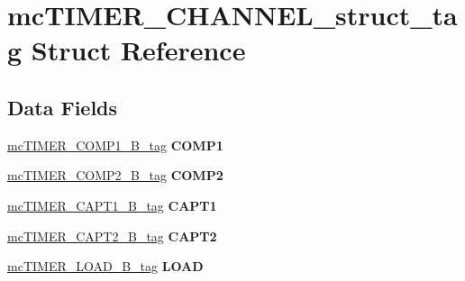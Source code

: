 \hypertarget{structmcTIMER__CHANNEL__struct__tag}{}\section{mc\+T\+I\+M\+E\+R\+\_\+\+C\+H\+A\+N\+N\+E\+L\+\_\+struct\+\_\+tag Struct Reference}
\label{structmcTIMER__CHANNEL__struct__tag}
\subsection*{Data Fields}
\begin{DoxyCompactItemize}
\item 
\mbox{\label{structmcTIMER__CHANNEL__struct__tag_a0a1e902e42060cc5f6656017c31a47cc}} 
\mbox{\hyperlink{unionmcTIMER__COMP1__16B__tag}{mc\+T\+I\+M\+E\+R\+\_\+\+C\+O\+M\+P1\+\_\+B\+\_\+tag}} {\bfseries C\+O\+M\+P1}
\item 
\mbox{\label{structmcTIMER__CHANNEL__struct__tag_a71be2052f0bfc9af76dfc9df661fd1a9}} 
\mbox{\hyperlink{unionmcTIMER__COMP2__16B__tag}{mc\+T\+I\+M\+E\+R\+\_\+\+C\+O\+M\+P2\+\_\+B\+\_\+tag}} {\bfseries C\+O\+M\+P2}
\item 
\mbox{\label{structmcTIMER__CHANNEL__struct__tag_aef961e7741068f7a682167849ea41e52}} 
\mbox{\hyperlink{unionmcTIMER__CAPT1__16B__tag}{mc\+T\+I\+M\+E\+R\+\_\+\+C\+A\+P\+T1\+\_\+B\+\_\+tag}} {\bfseries C\+A\+P\+T1}
\item 
\mbox{\label{structmcTIMER__CHANNEL__struct__tag_a3dcc2d08c7930d6048ecef117cad4a13}} 
\mbox{\hyperlink{unionmcTIMER__CAPT2__16B__tag}{mc\+T\+I\+M\+E\+R\+\_\+\+C\+A\+P\+T2\+\_\+B\+\_\+tag}} {\bfseries C\+A\+P\+T2}
\item 
\mbox{\label{structmcTIMER__CHANNEL__struct__tag_aa54e3de5842adbdc1a2acdab4c690eef}} 
\mbox{\hyperlink{unionmcTIMER__LOAD__16B__tag}{mc\+T\+I\+M\+E\+R\+\_\+\+L\+O\+A\+D\+\_\+B\+\_\+tag}} {\bfseries L\+O\+AD}
\item 
\mbox{\label{structmcTIMER__CHANNEL__struct__tag_ad919512c5482bafa21ae73440eb3656d}} 

\end{DoxyCompactItemize}
